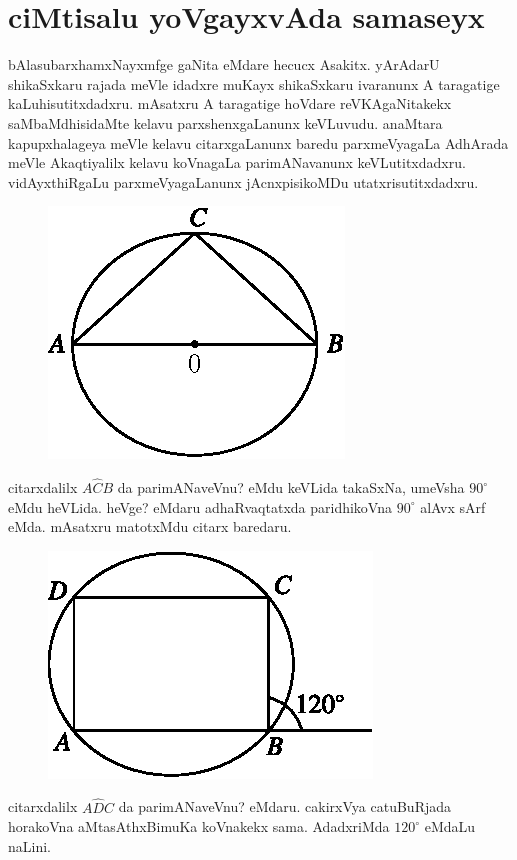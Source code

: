 \chapter{ciMtisalu yoVgayxvAda samaseyx} 

bAlasubarxhamxNayxmfge gaNita eMdare hecucx Asakitx. yArAdarU shikaSxkaru rajada meVle idadxre muKayx shikaSxkaru ivaranunx A taragatige kaLuhisutitxdadxru. mAsatxru A taragatige hoVdare reVKAgaNitakekx saMbaMdhisidaMte kelavu parxshenxgaLanunx keVLuvudu. anaMtara kapupxhalageya meVle kelavu citarxgaLanunx baredu parxmeVyagaLa AdhArada meVle Akaqtiyalilx kelavu koVnagaLa parimANavanunx keVLutitxdadxru. vidAyxthiRgaLu parxmeVyagaLanunx jAcnxpisikoMDu utatxrisutitxdadxru.
\begin{figure}[H]
\centering
\includegraphics[scale=0.7]{src/figures/m_179a.eps} 
\end{figure}
citarxdalilx $A\widehat{C}B$ da parimANaveVnu? eMdu keVLida takaSxNa, umeVsha $90^\circ$ eMdu heVLida. heVge? eMdaru adhaRvaqtatxda paridhikoVna $90^\circ$ alAvx sArf eMda. mAsatxru matotxMdu citarx baredaru.
\begin{figure}[H]
\centering
\includegraphics[scale=0.7]{src/figures/m_179b.eps} 
\end{figure}
citarxdalilx $A\widehat{D}C$ da parimANaveVnu? eMdaru. cakirxVya catuBuRjada hora\-koVna aMtasAthxBimuKa koVnakekx sama. AdadxriMda $120^\circ$ eMdaLu naLini.
